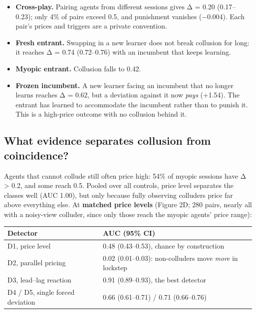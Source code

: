 \documentclass[11pt,a4paper]{article}
\providecommand{\tightlist}{\setlength{\itemsep}{1pt}\setlength{\parskip}{0pt}}
\begin{document}
\begin{itemize}
\tightlist
\item
  \textbf{Cross-play.} Pairing agents from different sessions gives Δ = 0.20 (0.17--0.23); only 4\% of pairs exceed 0.5, and punishment vanishes (−0.004). Each pair's prices and triggers are a private convention.
\item
  \textbf{Fresh entrant.} Swapping in a new learner does not break collusion for long: it reaches Δ = 0.74 (0.72--0.76) with an incumbent that keeps learning.
\item
  \textbf{Myopic entrant.} Collusion falls to 0.42.
\item
  \textbf{Frozen incumbent.} A new learner facing an incumbent that no longer learns reaches Δ = 0.62, but a deviation against it now \emph{pays} (+1.54). The entrant has learned to accommodate the incumbent rather than to punish it. This is a high-price outcome with no collusion behind it.
\end{itemize}

\hypertarget{what-evidence-separates-collusion-from-coincidence}{%
\subsection{What evidence separates collusion from coincidence?}\label{what-evidence-separates-collusion-from-coincidence}}

Agents that cannot collude still often price high: 54\% of myopic sessions have Δ \textgreater{} 0.2, and some reach 0.5. Pooled over all controls, price level separates the classes well (AUC 1.00), but only because fully observing colluders price far above everything else. At \textbf{matched price levels} (Figure 2D; 280 pairs, nearly all with a noisy-view colluder, since only those reach the myopic agents' price range):

\begingroup\small
\begin{longtable}[]{@{}ll@{}}
\toprule\noalign{}
Detector & AUC (95\% CI) \\
\midrule\noalign{}
\endhead
\bottomrule\noalign{}
\endlastfoot
D1, price level & 0.48 (0.43--0.53), chance by construction \\
D2, parallel pricing & 0.02 (0.01--0.03): non-colluders move \emph{more} in lockstep \\
D3, lead--lag reaction & 0.91 (0.89--0.93), the best detector \\
D4 / D5, single forced deviation & 0.66 (0.61--0.71) / 0.71 (0.66--0.76) \\
\end{longtable}
\endgroup
\end{document}
